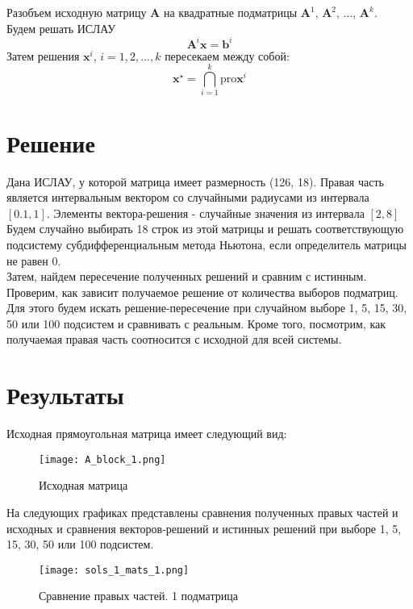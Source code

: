 Разобъем исходную матрицу $\textbf{A}$ на квадратные подматрицы $\textbf{A}^1$, $\textbf{A}^2$, ..., $\textbf{A}^k$. \\

Будем решать ИСЛАУ
\begin{equation}
	\textbf{A}^i \textbf{x} = \textbf{b}^i
\end{equation}
Затем решения $\textbf{x}^i$, $i=1, 2, ..., k$ пересекаем между собой:
\begin{equation}
	\textbf{x}^\star = \bigcap_{i=1}^{k} \text{pro} \textbf{x}^i
\end{equation}


\section{Решение}
Дана ИСЛАУ, у которой матрица имеет размерность (126, 18). Правая часть является интервальным вектором со случайными радиусами из интервала $[0.1, 1]$. Элементы вектора-решения - случайные значения из интервала $[2, 8]$ \\

Будем случайно выбирать 18 строк из этой матрицы и решать соответствующую подсистему субдифференциальным метода Ньютона, если определитель матрицы не равен 0. \\

Затем, найдем пересечение полученных решений и сравним с истинным. \\

Проверим, как зависит получаемое решение от количества выборов подматриц. Для этого будем искать решение-пересечение при случайном выборе 1, 5, 15, 30, 50 или 100 подсистем и сравнивать с реальным. Кроме того, посмотрим, как получаемая правая часть соотносится с исходной для всей системы.



\section{Результаты}
Исходная прямоугольная матрица имеет следующий вид:

\begin{figure}[h]
	\centering
	\texttt{[image: A\_block\_1.png]}
	\caption{Исходная матрица}
\end{figure}

На следующих графиках представлены сравнения полученных правых частей и исходных и сравнения векторов-решений и истинных решений при выборе 1, 5, 15, 30, 50 или 100 подсистем.
\newpage
\begin{figure}[h]
	\centering
	\texttt{[image: sols\_1\_mats\_1.png]}
	\caption{Сравнение правых частей. 1 подматрица}
\end{figure}

